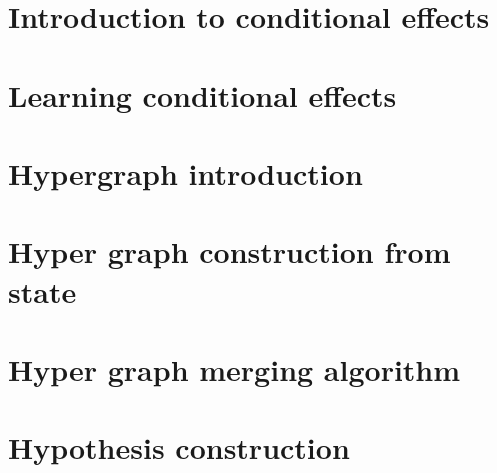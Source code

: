 \documentclass[Master.tex]{subfiles}
\begin{document}
\section{Introduction to conditional effects}
    

\section{Learning conditional effects}
    

\section{Hypergraph introduction}
    

\section{Hyper graph construction from state}
	

\section{Hyper graph merging algorithm}
	

\section{Hypothesis construction}
\end{document}
